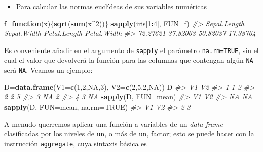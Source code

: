 \documentclass[
]{book}
\newenvironment{Shaded}{\begin{snugshade}}{\end{snugshade}}
\newcommand{\CommentTok}[1]{\textcolor[rgb]{0.56,0.35,0.01}{\textit{#1}}}
\newcommand{\ControlFlowTok}[1]{\textcolor[rgb]{0.13,0.29,0.53}{\textbf{#1}}}
\newcommand{\DataTypeTok}[1]{\textcolor[rgb]{0.13,0.29,0.53}{#1}}
\newcommand{\DecValTok}[1]{\textcolor[rgb]{0.00,0.00,0.81}{#1}}
\newcommand{\KeywordTok}[1]{\textcolor[rgb]{0.13,0.29,0.53}{\textbf{#1}}}
\newcommand{\NormalTok}[1]{#1}
\newcommand{\OperatorTok}[1]{\textcolor[rgb]{0.81,0.36,0.00}{\textbf{#1}}}
\newcommand{\OtherTok}[1]{\textcolor[rgb]{0.56,0.35,0.01}{#1}}
\providecommand{\tightlist}{%
  \setlength{\itemsep}{0pt}\setlength{\parskip}{0pt}}
\theoremstyle{definition}
\theoremstyle{definition}
\theoremstyle{definition}
\theoremstyle{remark}
\begin{document}
\begin{itemize}
\tightlist
\item
  Para calcular las normas euclídeas de sus variables numéricas
\end{itemize}

\begin{Shaded}
\begin{Highlighting}[]
\NormalTok{f=}\ControlFlowTok{function}\NormalTok{(x)\{}\KeywordTok{sqrt}\NormalTok{(}\KeywordTok{sum}\NormalTok{(x}\OperatorTok{\^{}}\DecValTok{2}\NormalTok{))\} }
\KeywordTok{sapply}\NormalTok{(iris[}\DecValTok{1}\OperatorTok{:}\DecValTok{4}\NormalTok{], }\DataTypeTok{FUN=}\NormalTok{f) }
\CommentTok{\#\textgreater{} Sepal.Length  Sepal.Width Petal.Length  Petal.Width }
\CommentTok{\#\textgreater{}     72.27621     37.82063     50.82037     17.38764}
\end{Highlighting}
\end{Shaded}

Es conveniente añadir en el argumento de \texttt{sapply} el parámetro \texttt{na.rm=TRUE}, sin el cual el valor que devolverá la función para las columnas que contengan algún \texttt{NA} será \texttt{NA}. Veamos un ejemplo:

\begin{Shaded}
\begin{Highlighting}[]
\NormalTok{D=}\KeywordTok{data.frame}\NormalTok{(}\DataTypeTok{V1=}\KeywordTok{c}\NormalTok{(}\DecValTok{1}\NormalTok{,}\DecValTok{2}\NormalTok{,}\OtherTok{NA}\NormalTok{,}\DecValTok{3}\NormalTok{), }\DataTypeTok{V2=}\KeywordTok{c}\NormalTok{(}\DecValTok{2}\NormalTok{,}\DecValTok{5}\NormalTok{,}\DecValTok{2}\NormalTok{,}\OtherTok{NA}\NormalTok{))}
\NormalTok{D}
\CommentTok{\#\textgreater{}   V1 V2}
\CommentTok{\#\textgreater{} 1  1  2}
\CommentTok{\#\textgreater{} 2  2  5}
\CommentTok{\#\textgreater{} 3 NA  2}
\CommentTok{\#\textgreater{} 4  3 NA}
\KeywordTok{sapply}\NormalTok{(D, }\DataTypeTok{FUN=}\NormalTok{mean)}
\CommentTok{\#\textgreater{} V1 V2 }
\CommentTok{\#\textgreater{} NA NA}
\KeywordTok{sapply}\NormalTok{(D, }\DataTypeTok{FUN=}\NormalTok{mean, }\DataTypeTok{na.rm=}\OtherTok{TRUE}\NormalTok{)}
\CommentTok{\#\textgreater{} V1 V2 }
\CommentTok{\#\textgreater{}  2  3}
\end{Highlighting}
\end{Shaded}

A menudo querremos aplicar una función a variables de un \emph{data frame} clasificadas por los niveles de un, o más de un, factor; esto se puede hacer con la instrucción \texttt{aggregate}, cuya sintaxis básica es
\end{document}
